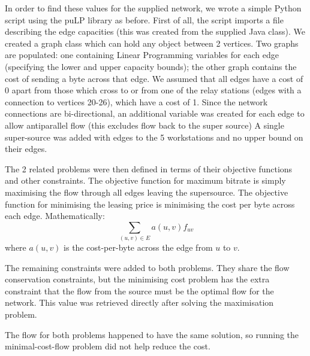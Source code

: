 \documentclass[a4paper, 10pt, oneside, article]{memoir}
\begin{document}
In order to find these values for the supplied network, we wrote a simple Python script using the puLP library as before.
First of all, the script imports a file describing the edge capacities (this was created from the supplied Java class). We created a graph class which can hold any object between 2 vertices. Two graphs are populated: one containing Linear Programming variables for each edge (specifying the lower and upper capacity bounds); the other graph contains the cost of sending a byte across that edge. We assumed that all edges have a cost of 0 apart from those which cross to or from one of the relay stations (edges with a connection to vertices 20-26), which have a cost of 1.
Since the network connections are bi-directional, an additional variable was created for each edge to allow antiparallel flow (this excludes flow back to the super source)
A single super-source was added with edges to the 5 workstations and no upper bound on their edges.

The 2 related problems were then defined in terms of their objective functions and other constraints. The objective function for maximum bitrate is simply maximising the flow through all edges leaving the supersource. The objective function for minimising the leasing price is minimising the cost per byte across each edge. Mathematically:
\begin{equation*}
\sum_{(u,v) \in E} a(u,v) f_{uv}
\end{equation*}
where $a(u,v)$ is the cost-per-byte across the edge from $u$ to $v$.

The remaining constraints were added to both problems. They share the flow conservation constraints, but the minimising cost problem has the extra constraint that the flow from the source must be the optimal flow for the network. This value was retrieved directly after solving the maximisation problem.

The flow for both problems happened to have the same solution, so running the minimal-cost-flow problem did not help reduce the cost.


\end{document}
